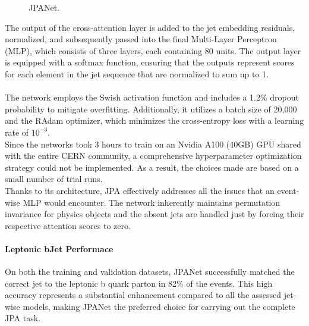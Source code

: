 \begin{minipage}{0.33\linewidth}
\begin{figure}[H]
    \caption{JPANet.}
    \label{fig:JPANet1}
\end{figure}
\end{minipage}
\hfill
\begin{minipage}{0.62\linewidth}
\vspace{-0.3cm}
The output of the cross-attention layer is added to the jet embedding residuals, normalized, and subsequently passed into the final Multi-Layer Perceptron (MLP), which consists of three layers, each containing 80 units. The output layer is equipped with a softmax function, ensuring that the outputs represent scores for each element in the jet sequence that are normalized to sum up to 1.\\
\\
The network employs the Swish activation function and includes a 1.2\% dropout probability to mitigate overfitting. Additionally, it utilizes a batch size of 20,000 and the RAdam optimizer, which minimizes the cross-entropy loss with a learning rate of $10^{-3}$.\\
Since the networks took 3 hours to train on an Nvidia A100 (40GB) GPU shared with the entire CERN community, a comprehensive hyperparameter optimization strategy could not be implemented. As a result, the choices made are based on a small number of trial runs.\\
Thanks to its architecture, JPA effectively addresses all the issues that an event-wise MLP would encounter. The network inherently maintains permutation invariance for physics objects and the absent jets are handled just by forcing their respective attention scores to zero.
\end{minipage}


\paragraph*{Leptonic bJet Performace} On both the training and validation datasets, JPANet successfully matched the correct jet to the leptonic b quark parton in 82\% of the events. This high accuracy represents a substantial enhancement compared to all the assessed jet-wise models, making JPANet the preferred choice for carrying out the complete JPA task.




